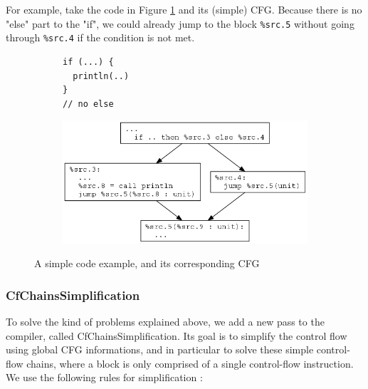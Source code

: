 \documentclass[12pt,a4paper]{article}
\newcommand{\scala}[1]{\textsf{#1}}
\newcommand{\nir}[1]{\texttt{#1}}
\begin{document}
For example, take the code in Figure \ref{fig:cfc} and its (simple) CFG. Because there is no "else" part to the "if", we could already jump to the block \nir{\%src.5} without going through \nir{\%src.4} if the condition is not met.

\begin{figure}
	\begin{subfigure}{0.5\textwidth}
		\begin{lstlisting}[style=scalasnp]
if (...) {
  println(..)
}
// no else
		\end{lstlisting}
	\end{subfigure}
	\quad
	\begin{subfigure}{0.5\textwidth}
		\includegraphics[width=\textwidth]{images/cfc-cfg1.png}
	\end{subfigure}
	\caption{A simple code example, and its corresponding CFG}
	\label{fig:cfc}
\end{figure}

\subsubsection*{CfChainsSimplification}

To solve the kind of problems explained above, we add a new pass to the compiler, called \scala{CfChainsSimplification}. Its goal is to simplify the control flow using global CFG informations, and in particular to solve these simple control-flow chains, where a block is only comprised of a single control-flow instruction. We use the following rules for simplification :
\end{document}
